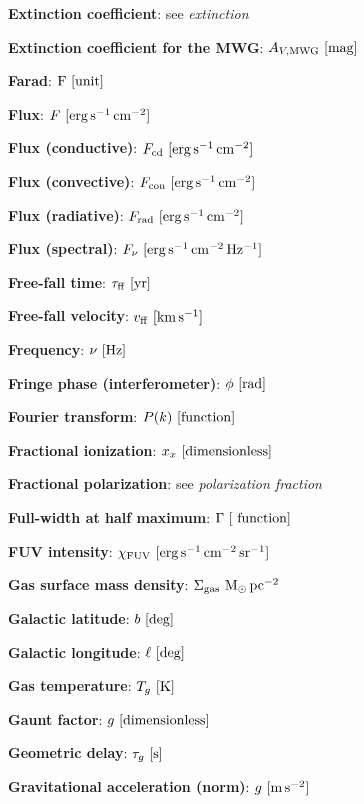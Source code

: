 \documentclass[a4paper,10pt]{article}
\begin{document}
{\noindent}\textbf{Extinction coefficient}: see \textit{extinction}

{\noindent}\textbf{Extinction coefficient for the MWG}: $A_{V,\mathrm{MWG}} ~ [{\rm mag}]$

{\noindent}\textbf{Farad}: ${\rm F} ~ [{\rm unit}]$

{\noindent}\textbf{Flux}: $F ~ [{\rm erg\,s^{-1}\,cm^{-2}}]$

{\noindent}\textbf{Flux (conductive)}: $F_{\rm cd} ~ [{\rm erg\,s^{-1}\,cm^{-2}}]$

{\noindent}\textbf{Flux (convective)}: $F_{\rm con} ~ [{\rm erg\,s^{-1}\,cm^{-2}}]$

{\noindent}\textbf{Flux (radiative)}: $F_{\rm rad} ~ [{\rm erg\,s^{-1}\,cm^{-2}}]$

{\noindent}\textbf{Flux (spectral)}: $F_\nu ~ [{\rm erg\,s^{-1}\,cm^{-2}\,Hz^{-1}}]$

{\noindent}\textbf{Free-fall time}: $\tau_{\rm ff} ~ [{\rm yr}]$

{\noindent}\textbf{Free-fall velocity}: $v_{\rm ff} ~ [{\rm km\,s^{-1}}]$

{\noindent}\textbf{Frequency}: $\nu ~ [{\rm Hz}]$

{\noindent}\textbf{Fringe phase (interferometer)}: $\phi ~ [{\rm rad}]$

{\noindent}\textbf{Fourier transform}: $P(k) ~ [{\rm function}]$

{\noindent}\textbf{Fractional ionization}: $x_x ~ [{\rm dimensionless}]$

{\noindent}\textbf{Fractional polarization}: see \textit{polarization fraction}

{\noindent}\textbf{Full-width at half maximum}: $\Gamma ~ [{\rm ~ function}]$

{\noindent}\textbf{FUV intensity}: $\chi_{\rm FUV} ~ [{\rm erg\,s^{-1}\,cm^{-2}\,sr^{-1}}]$

{\noindent}\textbf{Gas surface mass density}: $\Sigma_\mathrm{gas} ~ {\rm M_\odot\,pc^{-2}}$

{\noindent}\textbf{Galactic latitude}: $b ~ [{\rm deg}]$

{\noindent}\textbf{Galactic longitude}: $\ell ~ [{\rm deg}]$

{\noindent}\textbf{Gas temperature}: $T_g ~ [{\rm K}]$

{\noindent}\textbf{Gaunt factor}: $g ~ [{\rm dimensionless}]$

{\noindent}\textbf{Geometric delay}: $\tau_g ~ [{\rm s}]$

{\noindent}\textbf{Gravitational acceleration (norm)}: $g ~ [{\rm m\,s^{-2}}]$
\end{document}
